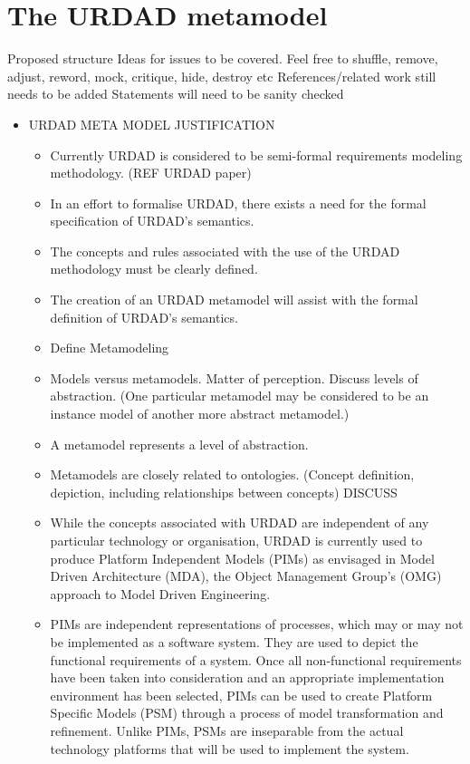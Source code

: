 \section{The URDAD metamodel}

Proposed structure
Ideas for issues to be covered.
Feel free to shuffle, remove, adjust, reword, mock, critique, hide, destroy etc
References/related work still needs to be added
Statements will need to be sanity checked

\begin{itemize}

	\item URDAD META MODEL JUSTIFICATION
	\begin{itemize}
		\item Currently URDAD is considered to be semi-formal requirements modeling methodology. (REF URDAD paper)
		\item In an effort to formalise URDAD, there exists a need for the formal specification of URDAD's semantics.
		\item The concepts and rules associated with the use of the URDAD methodology must be clearly defined.
		\item The creation of an URDAD metamodel will assist with the formal definition of URDAD's semantics.
		\item Define Metamodeling
		\item Models versus metamodels. Matter of perception. Discuss levels of abstraction. (One particular metamodel may be considered to be an instance model of another more abstract metamodel.) 
		\item A metamodel represents a level of abstraction.
		\item	Metamodels are closely related to ontologies. (Concept definition, depiction, including relationships between concepts) DISCUSS
		\item While the concepts associated with URDAD are independent of any particular technology or organisation, URDAD is currently used to produce Platform Independent Models (PIMs) as envisaged in Model Driven Architecture (MDA), the Object Management Group's (OMG) approach to Model Driven Engineering. 
		\item PIMs are independent representations of processes, which may or may not be implemented as a software system. They are used to depict the functional requirements of a system. Once all non-functional requirements have been taken into consideration and an appropriate implementation environment has been selected, PIMs can be used to create Platform Specific Models (PSM) through a process of model transformation and refinement. Unlike PIMs, PSMs are inseparable from the actual technology platforms that will be used to implement the system.

\end{itemize}
\end{itemize}
